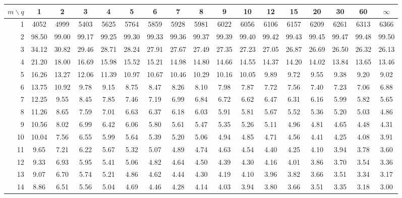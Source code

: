 \begin{center}\scriptsize\setlength{\tabcolsep}{2.6pt}\renewcommand{\arraystretch}{1.0}\label{tab:f01}
\begin{tabular}{r|cccccccccccccccc}\toprule
$m\backslash q$ & 1 & 2 & 3 & 4 & 5 & 6 & 7 & 8 & 9 & 10 & 12 & 15 & 20 & 30 & 60 & $\infty$\\\midrule
1 & 4052 & 4999 & 5403 & 5625 & 5764 & 5859 & 5928 & 5981 & 6022 & 6056 & 6106 & 6157 & 6209 & 6261 & 6313 & 6366\\
2 & 98.50 & 99.00 & 99.17 & 99.25 & 99.30 & 99.33 & 99.36 & 99.37 & 99.39 & 99.40 & 99.42 & 99.43 & 99.45 & 99.47 & 99.48 & 99.50\\
3 & 34.12 & 30.82 & 29.46 & 28.71 & 28.24 & 27.91 & 27.67 & 27.49 & 27.35 & 27.23 & 27.05 & 26.87 & 26.69 & 26.50 & 26.32 & 26.13\\
4 & 21.20 & 18.00 & 16.69 & 15.98 & 15.52 & 15.21 & 14.98 & 14.80 & 14.66 & 14.55 & 14.37 & 14.20 & 14.02 & 13.84 & 13.65 & 13.46\\
5 & 16.26 & 13.27 & 12.06 & 11.39 & 10.97 & 10.67 & 10.46 & 10.29 & 10.16 & 10.05 & 9.89 & 9.72 & 9.55 & 9.38 & 9.20 & 9.02\\
6 & 13.75 & 10.92 & 9.78 & 9.15 & 8.75 & 8.47 & 8.26 & 8.10 & 7.98 & 7.87 & 7.72 & 7.56 & 7.40 & 7.23 & 7.06 & 6.88\\
7 & 12.25 & 9.55 & 8.45 & 7.85 & 7.46 & 7.19 & 6.99 & 6.84 & 6.72 & 6.62 & 6.47 & 6.31 & 6.16 & 5.99 & 5.82 & 5.65\\
8 & 11.26 & 8.65 & 7.59 & 7.01 & 6.63 & 6.37 & 6.18 & 6.03 & 5.91 & 5.81 & 5.67 & 5.52 & 5.36 & 5.20 & 5.03 & 4.86\\
9 & 10.56 & 8.02 & 6.99 & 6.42 & 6.06 & 5.80 & 5.61 & 5.47 & 5.35 & 5.26 & 5.11 & 4.96 & 4.81 & 4.65 & 4.48 & 4.31\\
10 & 10.04 & 7.56 & 6.55 & 5.99 & 5.64 & 5.39 & 5.20 & 5.06 & 4.94 & 4.85 & 4.71 & 4.56 & 4.41 & 4.25 & 4.08 & 3.91\\
11 & 9.65 & 7.21 & 6.22 & 5.67 & 5.32 & 5.07 & 4.89 & 4.74 & 4.63 & 4.54 & 4.40 & 4.25 & 4.10 & 3.94 & 3.78 & 3.60\\
12 & 9.33 & 6.93 & 5.95 & 5.41 & 5.06 & 4.82 & 4.64 & 4.50 & 4.39 & 4.30 & 4.16 & 4.01 & 3.86 & 3.70 & 3.54 & 3.36\\
13 & 9.07 & 6.70 & 5.74 & 5.21 & 4.86 & 4.62 & 4.44 & 4.30 & 4.19 & 4.10 & 3.96 & 3.82 & 3.66 & 3.51 & 3.34 & 3.17\\
14 & 8.86 & 6.51 & 5.56 & 5.04 & 4.69 & 4.46 & 4.28 & 4.14 & 4.03 & 3.94 & 3.80 & 3.66 & 3.51 & 3.35 & 3.18 & 3.00\\

\end{tabular}
\end{center}
